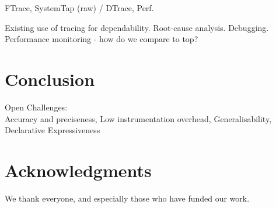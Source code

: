 \documentclass[letterpaper,twocolumn,10pt]{article}
\begin{document}
FTrace, SystemTap (raw) / DTrace, Perf.

Existing use of tracing for dependability.\newline
Root-cause analysis. Debugging. Performance monitoring - how do we compare to
top?

\section{Conclusion}
Open Challenges:\\
Accuracy and preciseness,
Low instrumentation overhead,
Generalisability,
Declarative Expressiveness

\section{Acknowledgments}

We thank everyone, and especially those who have funded our work.

{\footnotesize 
}
\end{document}
